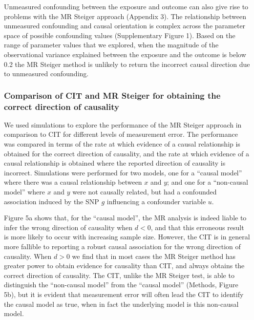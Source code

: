 \documentclass[]{article}
\begin{document}
Unmeasured confounding between the exposure and outcome can also give
rise to problems with the MR Steiger approach (Appendix 3). The
relationship between unmeasured confounding and causal orientation is
complex across the parameter space of possible confounding values
(Supplementary Figure 1). Based on the range of parameter values that we
explored, when the magnitude of the observational variance explained
between the exposure and the outcome is below 0.2 the MR Steiger method
is unlikely to return the incorrect causal direction due to unmeasured
confounding.

\subsubsection{Comparison of CIT and MR Steiger for obtaining the
correct direction of
causality}\label{comparison-of-cit-and-mr-steiger-for-obtaining-the-correct-direction-of-causality}

We used simulations to explore the performance of the MR Steiger
approach in comparison to CIT for different levels of measurement error.
The performance was compared in terms of the rate at which evidence of a
causal relationship is obtained for the correct direction of causality,
and the rate at which evidence of a causal relationship is obtained
where the reported direction of causality is incorrect. Simulations were
performed for two models, one for a ``causal model'' where there was a
causal relationship between \(x\) and \(y\); and one for a ``non-causal
model'' where \(x\) and \(y\) were not causally related, but had a
confounded association induced by the SNP \(g\) influencing a confounder
variable \(u\).

Figure 5a shows that, for the ``causal model'', the MR analysis is
indeed liable to infer the wrong direction of causality when \(d < 0\),
and that this erroneous result is more likely to occur with increasing
sample size. However, the CIT is in general more fallible to reporting a
robust causal association for the wrong direction of causality. When
\(d > 0\) we find that in most cases the MR Steiger method has greater
power to obtain evidence for causality than CIT, and always obtains the
correct direction of causality. The CIT, unlike the MR Steiger test, is
able to distinguish the ``non-causal model'' from the ``causal model''
(Methods, Figure 5b), but it is evident that measurement error will
often lead the CIT to identify the causal model as true, when in fact
the underlying model is this non-causal model.
\end{document}
